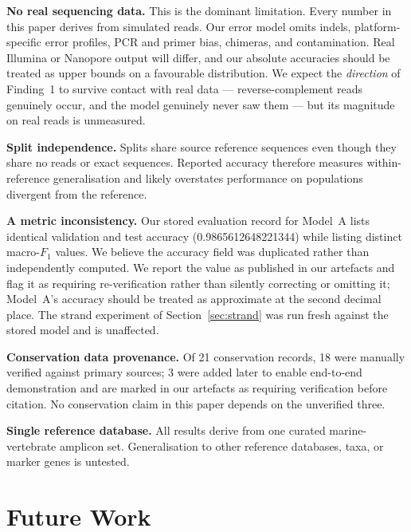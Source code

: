 \documentclass[conference]{IEEEtran}
\begin{document}
\textbf{No real sequencing data.} This is the dominant limitation. Every
number in this paper derives from simulated reads. Our error model omits
indels, platform-specific error profiles, PCR and primer bias, chimeras,
and contamination. Real Illumina or Nanopore output will differ, and our
absolute accuracies should be treated as upper bounds on a favourable
distribution. We expect the \emph{direction} of Finding~1 to survive contact
with real data --- reverse-complement reads genuinely occur, and the model
genuinely never saw them --- but its magnitude on real reads is unmeasured.

\textbf{Split independence.} Splits share source reference sequences even
though they share no reads or exact sequences. Reported accuracy therefore
measures within-reference generalisation and likely overstates performance
on populations divergent from the reference.

\textbf{A metric inconsistency.} Our stored evaluation record for Model~A
lists identical validation and test accuracy (0.9865612648221344) while
listing distinct macro-$F_1$ values. We believe the accuracy field was
duplicated rather than independently computed. We report the value as
published in our artefacts and flag it as requiring re-verification rather
than silently correcting or omitting it; Model~A's accuracy should be
treated as approximate at the second decimal place. The strand experiment of
Section~\ref{sec:strand} was run fresh against the stored model and is
unaffected.

\textbf{Conservation data provenance.} Of 21 conservation records, 18 were
manually verified against primary sources; 3 were added later to enable
end-to-end demonstration and are marked in our artefacts as requiring
verification before citation. No conservation claim in this paper depends
on the unverified three.

\textbf{Single reference database.} All results derive from one curated
marine-vertebrate amplicon set. Generalisation to other reference
databases, taxa, or marker genes is untested.

\section{Future Work}
\end{document}

